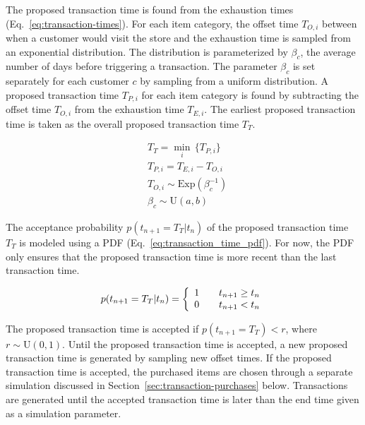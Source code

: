 \documentclass[conference]{IEEEtran}
\begin{document}
The proposed transaction time is found from the exhaustion times (Eq.~\ref{eq:transaction-times}).  For each item category, the offset time $T_{O, i}$ between when a customer would visit the store and the exhaustion time is sampled from an exponential distribution. The distribution is parameterized by $\beta_c$, the average number of days before triggering a transaction. The parameter $\beta_c$ is set separately for each customer $c$ by sampling from a uniform distribution. A proposed transaction time $T_{P, i}$ for each item category is found by subtracting the offset time $T_{O, i}$ from the exhaustion time $T_{E, i}$.  The earliest proposed transaction time is taken as the overall proposed transaction time $T_T$.

\begin{align} \label{eq:transaction-times}
&T_T = \min_i \, \{  T_{P, i}\} \\
&T_{P, i} = T_{E,i} - T_{O, i} \nonumber\\
&T_{O, i} \sim \text{Exp}(\beta^{-1}_c) \nonumber \\
&\beta_c \sim \text{U}(a, b) \nonumber
\end{align}

The acceptance probability $p(t_{n+1}=T_T|t_n)$ of the proposed transaction time $T_T$ is modeled using a PDF (Eq.~\ref{eq:transaction_time_pdf}). For now, the PDF only ensures that the proposed transaction time is more recent than the last transaction time.


\begin{equation} \label{eq:transaction_time_pdf}
p(t_{n+1}=T_T|t_n) = \left\{ 
  \begin{array}{l l}
   1 & \quad t_{n+1} \geq t_n\\
   0 & \quad t_{n+1} < t_n
  \end{array} \right.
\end{equation}

The proposed transaction time is accepted if $p(t_{n+1}=T_T) < r$, where $r \sim \text{U}(0, 1)$. Until the proposed transaction time is accepted, a new proposed transaction time is generated by sampling new offset times. If the proposed transaction time is accepted, the purchased items are chosen through a separate simulation discussed in Section~\ref{sec:transaction-purchases} below. Transactions are generated until the accepted transaction time is later than the end time given as a simulation parameter.
\end{document}
